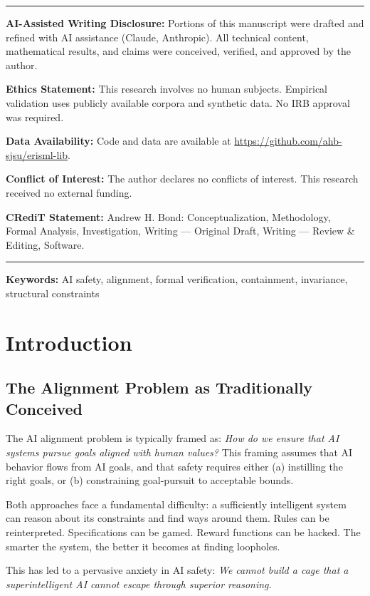 \documentclass[12pt]{article}
\theoremstyle{definition}
\begin{document}
\begin{titlepage}
\noindent\rule{\linewidth}{0.4pt}
\small
\noindent\textbf{AI-Assisted Writing Disclosure:} Portions of this manuscript were drafted and refined with AI assistance (Claude, Anthropic). All technical content, mathematical results, and claims were conceived, verified, and approved by the author.

\noindent\textbf{Ethics Statement:} This research involves no human subjects. Empirical validation uses publicly available corpora and synthetic data. No IRB approval was required.

\noindent\textbf{Data Availability:} Code and data are available at \url{https://github.com/ahb-sjsu/erisml-lib}.

\noindent\textbf{Conflict of Interest:} The author declares no conflicts of interest. This research received no external funding.

\noindent\textbf{CRediT Statement:} Andrew H. Bond: Conceptualization, Methodology, Formal Analysis, Investigation, Writing --- Original Draft, Writing --- Review \& Editing, Software.
\noindent\rule{\linewidth}{0.4pt}
\normalsize

\end{titlepage}

\noindent\textbf{Keywords:} AI safety, alignment, formal verification, containment, invariance, structural constraints

\section{Introduction}

\subsection{The Alignment Problem as Traditionally Conceived}

The AI alignment problem is typically framed as: \emph{How do we ensure that AI systems pursue goals aligned with human values?} This framing assumes that AI behavior flows from AI goals, and that safety requires either (a) instilling the right goals, or (b) constraining goal-pursuit to acceptable bounds.

Both approaches face a fundamental difficulty: a sufficiently intelligent system can reason about its constraints and find ways around them. Rules can be reinterpreted. Specifications can be gamed. Reward functions can be hacked. The smarter the system, the better it becomes at finding loopholes.

This has led to a pervasive anxiety in AI safety: \emph{We cannot build a cage that a superintelligent AI cannot escape through superior reasoning.}
\end{document}
